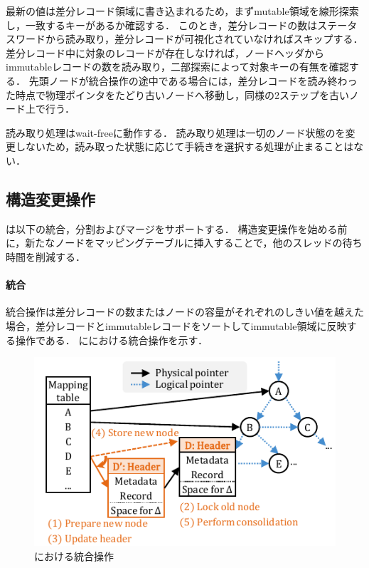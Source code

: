 最新の値は差分レコード領域に書き込まれるため，まずmutable領域を線形探索し，一致するキーがあるか確認する．
このとき，差分レコードの数はステータスワードから読み取り，差分レコードが可視化されていなければスキップする．
差分レコード中に対象のレコードが存在しなければ，ノードヘッダからimmutableレコードの数を読み取り，二部探索によって対象キーの有無を確認する．
先頭ノードが統合操作の途中である場合には，差分レコードを読み終わった時点で物理ポインタをたどり古いノードへ移動し，同様の2ステップを古いノード上で行う．

読み取り処理はwait-freeに動作する．
読み取り処理は一切のノード状態のを変更しないため，読み取った状態に応じて手続きを選択する処理が止まることはない．


\subsection{構造変更操作}

\Bctree{}は以下の統合，分割およびマージをサポートする．
構造変更操作を始める前に，新たなノードをマッピングテーブルに挿入することで，他のスレッドの待ち時間を削減する．

\paragraph{統合}

統合操作は差分レコードの数またはノードの容量がそれぞれのしきい値を越えた場合，差分レコードとimmutableレコードをソートしてimmutable領域に反映する操作である．
\Fig{\ref{fig:bc_tree_consolidastion}}に\Bctree{}における統合操作を示す．

\begin{figure}[t]
    \centering
    \includegraphics{./figures/Bc-consolidate.pdf}
    \caption{\Bctree{}における統合操作}
    \label{fig:bc_tree_consolidastion}
\end{figure}

